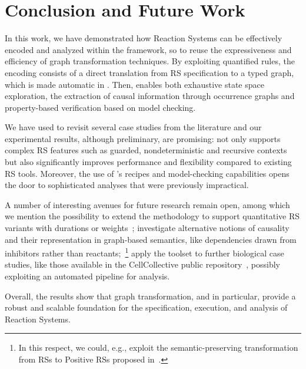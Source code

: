 
\section{Conclusion and Future Work}\label{sec:conc}

In this work, we have demonstrated how Reaction Systems can be effectively encoded and analyzed within the \GROOVE framework, so to reuse the expressiveness and efficiency of graph transformation techniques. By exploiting quantified rules, the encoding consists of a direct translation from RS specification to a typed graph, which is made automatic in \BioResolve.
Then, \GROOVE enables both exhaustive state space exploration, the extraction of causal information through occurrence graphs and property-based verification based on model checking.

We have used \GROOVE to revisit several case studies from the literature and our experimental results, although preliminary, are promising: \GROOVE not only supports complex RS features such as guarded, nondeterministic and recursive contexts but also significantly improves performance and flexibility compared to existing RS tools.
Moreover, the use of \GROOVE’s recipes and model-checking capabilities opens the door to sophisticated analyses that were previously impractical.

A number of interesting avenues for future research remain open, among which we mention the possibility to extend the methodology to support quantitative RS variants with durations or weights~\cite{DBLP:journals/nca/BrodoBFGLM23}; investigate alternative notions of causality and their representation in graph-based semantics, like dependencies drawn from inhibitors rather than reactants;~\footnote{In this respect, we could, e.g., exploit the semantic-preserving transformation from RSs to Positive RSs proposed in~\cite{DBLP:journals/sttt/BrodoBFGMMP24}.} apply the \GROOVE toolset to further biological case studies, like those available in the CellCollective public repository~\cite{helikar2012cell}, possibly exploiting an automated pipeline for analysis.

Overall, the results show that graph transformation, and \GROOVE in particular, provide a robust and scalable foundation for the specification, execution, and analysis of Reaction Systems.

